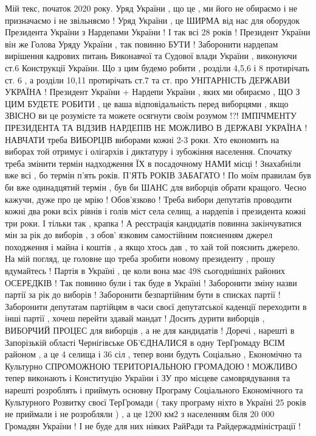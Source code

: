 Мій текс, початок 2020 року.
Уряд України , що це , ми його не обираємо і не призначаємо і не звільняємо ! Уряд України , це ШИРМА від нас для оборудок Президента України з Нардепами України !
І так всі 28 років !
Президент України він же Голова Уряду України , так повинно БУТИ !
Заборонити нардепам вирішення кадрових питань Виконавчої та Судової влади України , виконуючи ст.6 Конструкції України.
Що з цим будемо робити , розділи 4,5,6 і 8 протирічать ст. 6 , а розділи 10,11 протирічать ст.7 та ст. про УНІТАРНІСТЬ ДЕРЖАВИ УКРАЇНА !
Президент України + Нардепи України , яких ми обираємо , ЩО З ЦИМ БУДЕТЕ РОБИТИ , це ваша відповідальність перед виборцями , якщо ЗВІСНО ви це розумієте та можете осягнути своїм розумом !?!
ІМПІЧМЕНТУ ПРЕЗИДЕНТА ТА ВІДЗИВ НАРДЕПІВ НЕ МОЖЛИВО В ДЕРЖАВІ УКРАЇНА !
НАВЧАТИ треба ВИБОРЦІВ виборами кожні 2-3 роки.
Хто економить на виборах той отримує і олігархів і диктатуру і зубожіння населення.
Спочатку треба змінити термін надходження ЇХ в посадочному НАМИ місці !
Знахабніли вже всі , бо термін п'ять років.
П'ЯТЬ РОКІВ ЗАБАГАТО !
По моїм правилам був би вже одинадцятий термін , був би ШАНС для виборців обрати кращого.
Чесно кажучи, дуже про це мрію !
Обов'язково !
Треба вибори депутатів проводити кожні два роки всіх рівнів і голів міст села селищ, а нардепів і президента кожні три роки.
І тільки так , крапка !
А реєстрація кандидатів повинна закінчуватися мін за рік до виборів , з обов' язковим самостійним поясненням джерел походження і майна і коштів , а якщо хтось дав , то хай той пояснить джерело.
На мій погляд, це головне що треба зробити новому президенту , прошу вдумайтесь !
Партія в Україні , це коли вона має 498 сьогоднішніх районих ОСЕРЕДКІВ ! Так повинно були і так буде в Україні !
Заборонити зміну назви партії за рік до виборів !
Заборонити безпартійним бути в списках партії !
Заборонити депутатам партійцям в часи своєї депутатської каденції переходити в інші партії , хочеш перейти здавай мандат !
Досить дурити виборців , ВИБОРЧИЙ ПРОЦЕС для виборців , а не для кандидатів !
Доречі , нарешті в Запорізькій області Чернігівське ОБ'ЄДНАЛИСЯ в одну ТерГромаду ВСІМ районом , а це 4 селища і 36 сіл , тепер вони будуть Соціально , Економічно та Культурно СПРОМОЖНОЮ ТЕРИТОРІАЛЬНОЮ ГРОМАДОЮ !
МОЖЛИВО тепер виконають і Конституцію України і ЗУ про місцеве самоврядування та нарешті розроблять і приймуть основну Програму Соціального Економічного та Культурного Розвитку своєї ТерГромади ( таку програму ніхто в Україні 25 років не приймали і не розробляли ) , а це 1200 км2 з населенням біля 20 000 Громадян України !
І не буде для них ніяких РайРади та Райдержадміністрації !

